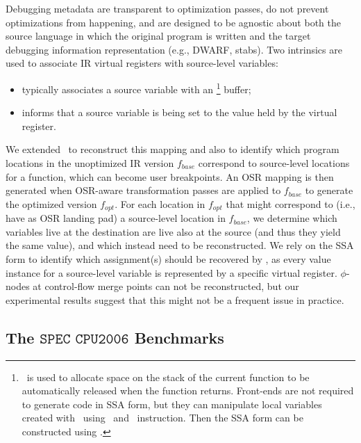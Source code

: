 Debugging metadata are transparent to optimization passes, do not prevent optimizations from happening, and are designed to be agnostic about both the source language in which the original program is written and the target debugging information representation (e.g., DWARF, stabs). Two intrinsics are used to associate IR virtual registers with source-level variables:
\begin{itemize}[itemsep=0pt,parsep=3pt]
 \item {} typically associates a source variable with an \alloca\footnote{\alloca\ is used to allocate space on the stack of the current function to be automatically released when the function returns. Front-ends are not required to generate code in SSA form, but they can manipulate local variables created with \alloca\ using \load\ and \store\ instruction. Then the SSA form can be constructed using \memtoreg.} buffer;
 \item {} informs that a source variable is being set to the value held by the virtual register.
\end{itemize}

\noindent We extended \tinyvm\ to reconstruct this mapping and also to identify which program locations in the unoptimized IR version $f_{base}$ correspond to source-level locations for a function, which can become user breakpoints. An OSR mapping is then generated when OSR-aware transformation passes are applied to $f_{base}$ to generate the optimized version $f_{opt}$. For each location in $f_{opt}$ that might correspond to (i.e., have as OSR landing pad) a source-level location in $f_{base}$, we determine which variables live at the destination are live also at the source (and thus they yield the same value), and which instead need to be reconstructed. We rely on the SSA form to identify which assignment(s) should be recovered by \reconstruct, as every value instance for a source-level variable is represented by a specific virtual register. $\phi$-nodes at control-flow merge points can not be reconstructed, but our experimental results suggest that this might not be a frequent issue in practice.


\subsection{The \texorpdfstring{$\texttt{SPEC CPU2006}$}{SPEC CPU2006} Benchmarks}

